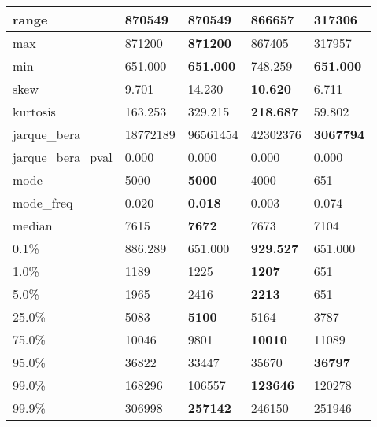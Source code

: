 \begin{table}[H]
\begin{tabular}{|l|m{10em}|m{10em}|m{10em}|m{10em}|}
\hline range & 870549 & \bfseries 870549 & 866657 & \cellcolor[rgb]{0.9, 0.54, 0.52} 317306 \\
\hline max & 871200 & \bfseries 871200 & 867405 & \cellcolor[rgb]{0.9, 0.54, 0.52} 317957 \\
\hline min & 651.000 & \bfseries 651.000 & \cellcolor[rgb]{0.9, 0.54, 0.52} 748.259 & \bfseries 651.000 \\
\hline skew & 9.701 & \cellcolor[rgb]{0.9, 0.54, 0.52} 14.230 & \bfseries 10.620 & 6.711 \\
\hline kurtosis & 163.253 & \cellcolor[rgb]{0.9, 0.54, 0.52} 329.215 & \bfseries 218.687 & 59.802 \\
\hline jarque\_bera & 18772189 & \cellcolor[rgb]{0.9, 0.54, 0.52} 96561454 & 42302376 & \bfseries 3067794 \\
\hline jarque\_bera\_pval & 0.000 & 0.000 & 0.000 & 0.000 \\
\hline mode & 5000 & \bfseries 5000 & 4000 & \cellcolor[rgb]{0.9, 0.54, 0.52} 651 \\
\hline mode\_freq & 0.020 & \bfseries 0.018 & 0.003 & \cellcolor[rgb]{0.9, 0.54, 0.52} 0.074 \\
\hline median & 7615 & \bfseries 7672 & 7673 & \cellcolor[rgb]{0.9, 0.54, 0.52} 7104 \\
\hline 0.1\% & 886.289 & \cellcolor[rgb]{0.9, 0.54, 0.52} 651.000 & \bfseries 929.527 & \cellcolor[rgb]{0.9, 0.54, 0.52} 651.000 \\
\hline 1.0\% & 1189 & 1225 & \bfseries 1207 & \cellcolor[rgb]{0.9, 0.54, 0.52} 651 \\
\hline 5.0\% & 1965 & 2416 & \bfseries 2213 & \cellcolor[rgb]{0.9, 0.54, 0.52} 651 \\
\hline 25.0\% & 5083 & \bfseries 5100 & 5164 & \cellcolor[rgb]{0.9, 0.54, 0.52} 3787 \\
\hline 75.0\% & 10046 & 9801 & \bfseries 10010 & \cellcolor[rgb]{0.9, 0.54, 0.52} 11089 \\
\hline 95.0\% & 36822 & \cellcolor[rgb]{0.9, 0.54, 0.52} 33447 & 35670 & \bfseries 36797 \\
\hline 99.0\% & 168296 & \cellcolor[rgb]{0.9, 0.54, 0.52} 106557 & \bfseries 123646 & 120278 \\
\hline 99.9\% & 306998 & \bfseries 257142 & \cellcolor[rgb]{0.9, 0.54, 0.52} 246150 & 251946 \\
\hline
\end{tabular}
\end{table}
